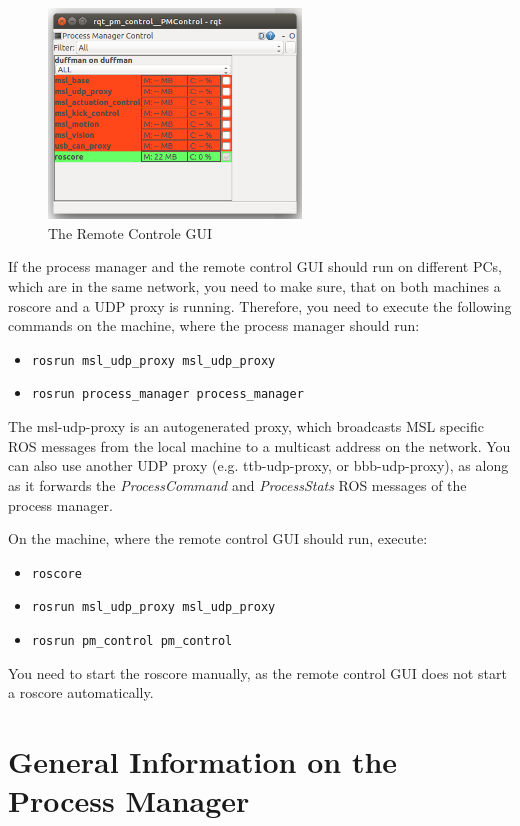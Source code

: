 \begin{figure}[htbp]
 \centering
 \includegraphics[width=0.6\textwidth]{pic/ProcManRemoteGUI.png}
 \caption{The Remote Controle GUI}
 \label{fig:ProcManRemoteGUI}
\end{figure}

If the process manager and the remote control GUI should run on different PCs, which are in the same network, you need to make sure, that on both machines a roscore and a UDP proxy is running. Therefore, you need to execute the following commands on the machine, where the process manager should run:
\begin{itemize}
 \item \verb#rosrun msl_udp_proxy msl_udp_proxy#
 \item \verb#rosrun process_manager process_manager#
\end{itemize}
The msl-udp-proxy is an autogenerated proxy, which broadcasts MSL specific ROS messages from the local machine to a multicast address on the network. You can also use another UDP proxy (e.g. ttb-udp-proxy, or bbb-udp-proxy), as along as it forwards the \emph{ProcessCommand} and \emph{ProcessStats} ROS messages of the process manager.

On the machine, where the remote control GUI should run, execute:
\begin{itemize}
 \item \verb#roscore#
 \item \verb#rosrun msl_udp_proxy msl_udp_proxy#
 \item \verb#rosrun pm_control pm_control#
\end{itemize}

You need to start the roscore manually, as the remote control GUI does not start a roscore automatically.

\section{General Information on the Process Manager}
\label{sec:GenProcMan}

